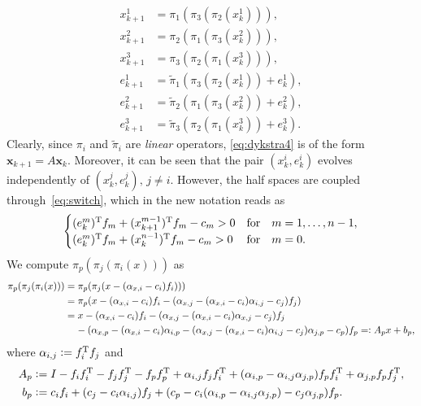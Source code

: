 \documentclass[hidelinks]{article}
\begin{document}
\newpage
\begin{subequations}
\begin{align}
x_{k+1}^1 &= \pi_1(\pi_3(\pi_2(x_k^1))),\\
x_{k+1}^2 &= \pi_2(\pi_1(\pi_3(x_k^2))),\\
x_{k+1}^3 &= \pi_3(\pi_2(\pi_1(x_k^3))),\\
e_{k+1}^1 &= \tilde{\pi}_1(\pi_3(\pi_2(x_k^1))+e_k^1),\\
e_{k+1}^2 &= \tilde{\pi}_2(\pi_1(\pi_3(x_k^2))+e_k^2),\\
e_{k+1}^3 &= \tilde{\pi}_3(\pi_2(\pi_1(x_k^3))+e_k^3).
\end{align}\label{eq:dykstra4}
\end{subequations}
Clearly, since $\pi_i$ and $\tilde{\pi}_i$ are \textit{linear} operators, \eqref{eq:dykstra4} is of the form $\mathbf{x}_{k+1} = A\mathbf{x}_{k}$. Moreover, it can be seen that the pair $(x_k^i, e_k^i)$ evolves independently of  $(x_k^j, e_k^j),\,j\neq i$. However, the half spaces are coupled through~\eqref{eq:switch}, which in the new notation reads as
\begin{align}\label{eq:switch2}
\begin{cases}
(e_k^{m})^{\text{T}} f_{m}+(x_{k+1}^{m-1})^{\text{T}} f_{m}-c_{m} > 0 & \text{for}\quad m=1,\dots,n-1,\\
(e_k^{m})^{\text{T}} f_{m}+(x_{k}^{n-1})^{\text{T}} f_{m}-c_{m} > 0 & \text{for}\quad m=0.\\
\end{cases}
\end{align}
We compute $\pi_p(\pi_j(\pi_i(x)))$ as
\begin{equation}
\begin{aligned}
\pi_p(\pi_j(\pi_i(x))) 
&= \pi_p(\pi_j(x-(\alpha_{x,i} - c_i)f_i)))\\
&= \pi_p(x-(\alpha_{x,i}-c_i)f_i-(\alpha_{x,j} - (\alpha_{x,i}-c_i)\alpha_{i,j} -c_j)f_j)\\
&= x-(\alpha_{x,i}-c_i)f_i-(\alpha_{x,j} - (\alpha_{x,i}-c_i)\alpha_{x,j} -c_j)f_j\\
&\phantom{=}\,\,-(\alpha_{x,p}-(\alpha_{x,i}-c_i)\alpha_{i,p}-(\alpha_{x,j} - (\alpha_{x,i}-c_i)\alpha_{i,j} -c_j)\alpha_{j,p} -c_p)f_p=\vcentcolon A_px+b_p,
\end{aligned}
\end{equation}
where $\alpha_{i,j}\vcentcolon= f_i^{\text{T}} f_j$ and
\begin{subequations}
\begin{align}
A_p&\vcentcolon= I-f_i f_i^{\text{T}}-f_j f_j^{\text{T}}-f_p f_p^{\text{T}}+\alpha_{i,j}f_j f_i^{\text{T}}+(\alpha_{i,p} -\alpha_{i,j}\alpha_{j,p})f_p f_i^{\text{T}}+\alpha_{j,p}f_pf_j^{\text{T}},\\
b_p&\vcentcolon= c_i f_i+(c_j-c_i\alpha_{i,j})f_j+(c_p-c_i(\alpha_{i,p}-\alpha_{i,j}\alpha_{j,p})-c_j\alpha_{j,p})f_p.
\end{align}
\end{subequations}
\end{document}
